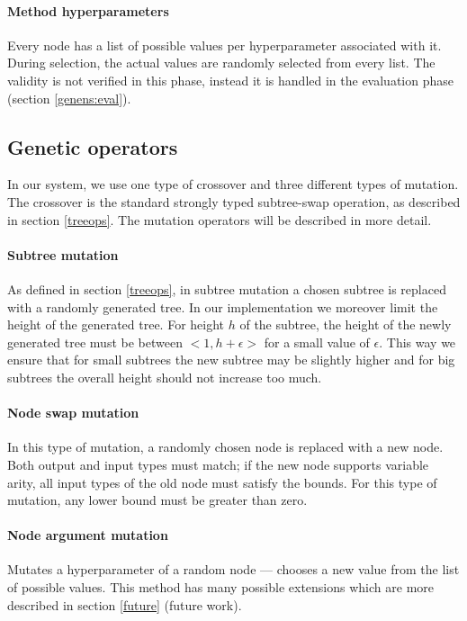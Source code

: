 \paragraph{Method hyperparameters}
Every node has a list of possible values per hyperparameter associated with
it. During selection, the actual values are randomly selected from every list.
The validity is not verified in this phase, instead it is handled in the
evaluation phase (section \ref{genens:eval}).

\subsection{Genetic operators} \label{sec:repro}
In our system, we use one type of crossover and three different types of
mutation. The crossover is the standard strongly typed subtree-swap operation,
as described in section \ref{treeops}.
The mutation operators will be described in more detail.

\paragraph{Subtree mutation}
As defined in section \ref{treeops}, in subtree mutation a chosen subtree is
replaced with a randomly generated tree. In our implementation we moreover
limit the height of the generated tree. For height $h$ of the subtree, the
height of the newly generated tree must be between $<1, h + \epsilon>$ for a
small value of $\epsilon$. This way we ensure that for small subtrees the new
subtree may be slightly higher and for big subtrees the overall height should
not increase too much.

\paragraph{Node swap mutation}
In this type of mutation, a randomly chosen node is replaced with a new node.
Both output and input types must match; if the new node supports variable
arity, all input types of the old node must satisfy the bounds. For this type
of mutation, any lower bound must be greater than zero.

\paragraph{Node argument mutation}
Mutates a hyperparameter of a random node --- chooses a new value from the list
of possible values. This method has many possible extensions which are more
described in section \ref{future} (future work).

